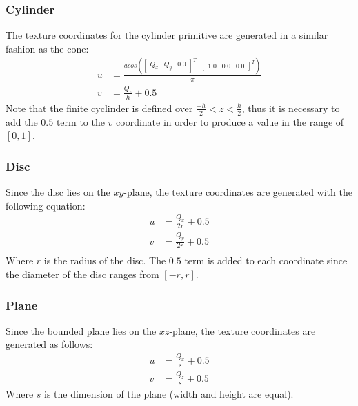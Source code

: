 \subsubsection*{Cylinder}
The texture coordinates for the cylinder primitive are generated in a similar
fashion as the cone:
\begin{equation}
\begin{split}
  u &= \frac{acos(\begin{bmatrix} Q_{x} & Q_{y} & 0.0 \end{bmatrix}^{T} \cdot 
  \begin{bmatrix} 1.0 & 0.0 & 0.0 \end{bmatrix}^{T})}{\pi} \\
  v &= \frac{Q_{z}}{h} + 0.5
\end{split}
\end{equation}
Note that the finite cyclinder is defined over $\frac{-h}{2} < z < \frac{h}{2}$,
thus it is necessary to add the $0.5$ term to the $v$ coordinate in order to
produce a value in the range of $[0, 1]$.

\subsubsection*{Disc}
Since the disc lies on the $xy$-plane, the texture coordinates are generated
with the following equation:
\begin{equation}
\begin{split}
  u &= \frac{Q_{x}}{2r} + 0.5 \\
  v &= \frac{Q_{y}}{2r} + 0.5 \\
\end{split}
\end{equation}
Where $r$ is the radius of the disc. The $0.5$ term is added to each coordinate 
since the diameter of the disc ranges from $[-r, r]$.

\subsubsection*{Plane}
Since the bounded plane lies on the $xz$-plane, the texture coordinates are
generated as follows:
\begin{equation}
\begin{split}
  u &= \frac{Q_{x}}{s} + 0.5 \\
  v &= \frac{Q_{z}}{s} + 0.5 
\end{split}
\end{equation}
Where $s$ is the dimension of the plane (width and height are equal). 

